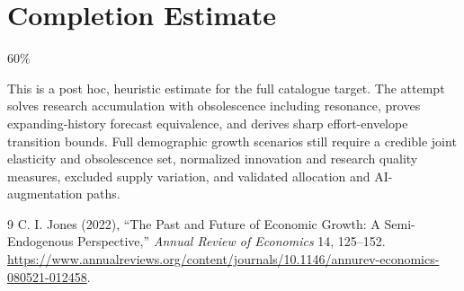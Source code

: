 \documentclass[11pt]{article}
\theoremstyle{definition}
\begin{document}
\section{Completion Estimate}
60\%

This is a post hoc, heuristic estimate for the full catalogue target.
The attempt solves research accumulation with obsolescence including resonance, proves expanding-history forecast equivalence, and derives sharp effort-envelope transition bounds. Full demographic growth scenarios still require a credible joint elasticity and obsolescence set, normalized innovation and research quality measures, excluded supply variation, and validated allocation and AI-augmentation paths.

\begin{thebibliography}{9}
 C. I. Jones (2022), ``The Past and Future of Economic Growth: A Semi-Endogenous Perspective,'' \emph{Annual Review of Economics} 14, 125--152. \url{https://www.annualreviews.org/content/journals/10.1146/annurev-economics-080521-012458}.
\end{thebibliography}
\end{document}
